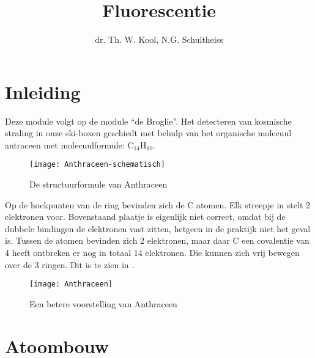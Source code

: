 



\title{Fluorescentie}
\author{dr. Th. W. Kool, N.G. Schultheiss}
\date{}

\maketitle
\thispagestyle{firststyle}

\section{Inleiding}

Deze module volgt op de module ``de Broglie''. Het detecteren van
kosmische straling in onze ski-boxen geschiedt met behulp van het
organische molecuul antraceen met molecuulformule: $\mathrm{C}_{14}\mathrm{H}_{10}$.

\begin{figure}[h]
\noindent \begin{centering}
\texttt{[image: Anthraceen-schematisch]}
\par\end{centering}

\caption{\label{fig:Structuurformule-Anthraceen}De structuurformule van Anthraceen}
\end{figure}

Op de hoekpunten van de ring bevinden zich de C atomen. Elk streepje
in  stelt 2 elektronen
voor. Bovenstaand plaatje is eigenlijk niet correct, omdat bij de
dubbele bindingen de elektronen vast zitten, hetgeen in de praktijk
niet het geval is. Tussen de atomen bevinden zich 2 elektronen, maar
daar C een covalentie van 4 heeft ontbreken er nog in totaal 14 elektronen.
Die kunnen zich vrij bewegen over de 3 ringen. Dit is te zien in
.

\begin{figure}[h]
\noindent \begin{centering}
\texttt{[image: Anthraceen]}
\par\end{centering}

\caption{\label{fig:Anthraceen2}Een betere voorstelling van Anthraceen}
\end{figure}


\section{Atoombouw}

